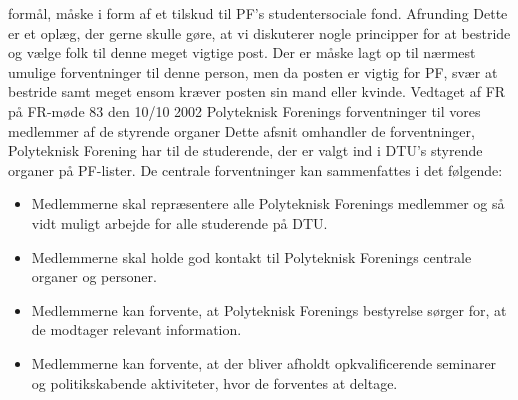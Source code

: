 formål, måske i form af et tilskud til PF’s studentersociale fond.
Afrunding
Dette er et oplæg, der gerne skulle gøre, at vi diskuterer nogle principper for at bestride og vælge folk til denne meget
vigtige post. Der er måske lagt op til nærmest umulige forventninger til denne person, men da posten er vigtig for PF,
svær at bestride samt meget ensom kræver posten sin mand eller kvinde.
Vedtaget af FR på FR-møde 83 den 10/10 2002
Polyteknisk Forenings forventninger til vores medlemmer af de styrende organer
Dette afsnit omhandler de forventninger, Polyteknisk Forening har til de studerende, der er valgt ind i DTU’s styrende
organer på PF-lister.
De centrale forventninger kan sammenfattes i det følgende:
\begin{itemize}
\item Medlemmerne skal repræsentere alle Polyteknisk Forenings medlemmer og så vidt muligt arbejde
for alle studerende på DTU.
\item Medlemmerne skal holde god kontakt til Polyteknisk Forenings centrale organer og personer.
\item Medlemmerne kan forvente, at Polyteknisk Forenings bestyrelse sørger for, at de modtager relevant
information.
\item Medlemmerne kan forvente, at der bliver afholdt opkvalificerende seminarer og politikskabende
aktiviteter, hvor de forventes at deltage.
\end{itemize}

